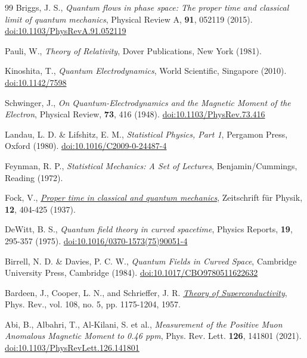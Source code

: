 \documentclass[%
 reprint,
 amsmath,amssymb,
 aps,
]{revtex4-1}
\numberwithin{equation}{section}%
\begin{document}
\begin{thebibliography}{99}
Briggs, J. S.,
\textit{Quantum flows in phase space: The proper time and classical limit of quantum mechanics},
Physical Review A,
\textbf{91}, 052119 (2015).
\href{https://doi.org/10.1103/PhysRevA.91.052119}{doi:10.1103/PhysRevA.91.052119}

Pauli, W.,
\textit{Theory of Relativity},
Dover Publications, New York (1981).

Kinoshita, T.,
\textit{Quantum Electrodynamics},
World Scientific, Singapore (2010).
\href{https://doi.org/10.1142/7598}{doi:10.1142/7598}

Schwinger, J.,
\textit{On Quantum-Electrodynamics and the Magnetic Moment of the Electron},
Physical Review,
\textbf{73}, 416 (1948).
\href{https://doi.org/10.1103/PhysRev.73.416}{doi:10.1103/PhysRev.73.416}

Landau, L. D. \& Lifshitz, E. M.,
\textit{Statistical Physics, Part 1},
Pergamon Press, Oxford (1980).
\href{https://doi.org/10.1016/C2009-0-24487-4}{doi:10.1016/C2009-0-24487-4}

Feynman, R. P.,
\textit{Statistical Mechanics: A Set of Lectures},
Benjamin/Cummings, Reading (1972).

Fock, V.,
\href{http://www.neo-classical-physics.info/uploads/3/4/3/6/34363841/fock_-_wkb_and_dirac.pdf}{\textit{Proper time in classical and quantum mechanics}},
Zeitschrift für Physik,
\textbf{12}, 404-425 (1937).

DeWitt, B. S.,
\textit{Quantum field theory in curved spacetime},
Physics Reports,
\textbf{19}, 295-357 (1975).
\href{https://doi.org/10.1016/0370-1573(75)90051-4}{doi:10.1016/0370-1573(75)90051-4}

Birrell, N. D. \& Davies, P. C. W.,
\textit{Quantum Fields in Curved Space},
Cambridge University Press, Cambridge (1984).
\href{https://doi.org/10.1017/CBO9780511622632}{doi:10.1017/CBO9780511622632}

Bardeen, J., Cooper, L. N., and Schrieffer, J. R. \href{https://journals.aps.org/pr/abstract/10.1103/PhysRev.108.1175}{\textit{Theory of Superconductivity}}, Phys. Rev., vol. 108, no. 5, pp. 1175-1204, 1957.

Abi, B., Albahri, T., Al-Kilani, S. et al.,
\textit{Measurement of the Positive Muon Anomalous Magnetic Moment to 0.46 ppm},
Phys. Rev. Lett. \textbf{126}, 141801 (2021).
\href{https://doi.org/10.1103/PhysRevLett.126.141801}{doi:10.1103/PhysRevLett.126.141801}


\end{thebibliography}
\end{document}
